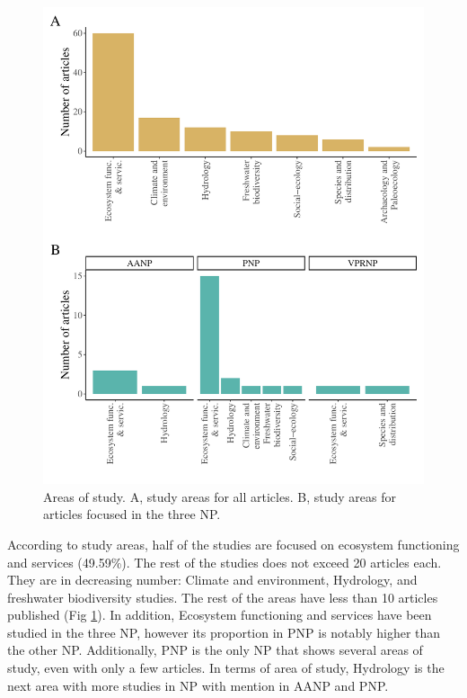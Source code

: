 \documentclass[]{article}
\begin{document}
\begin{figure}
\centering
\includegraphics{Review_and_climate_files/figure-latex/Areas-1.pdf}
\caption{\label{fig:Areas}Areas of study. A, study areas for all articles. B, study areas for articles focused in the three NP.}
\end{figure}

According to study areas, half of the studies are focused on ecosystem functioning and services (49.59\%). The rest of the studies does not exceed 20 articles each. They are in decreasing number: Climate and environment, Hydrology, and freshwater biodiversity studies. The rest of the areas have less than 10 articles published (Fig \ref{fig:Areas}).
In addition, Ecosystem functioning and services have been studied in the three NP, however its proportion in PNP is notably higher than the other NP. Additionally, PNP is the only NP that shows several areas of study, even with only a few articles. In terms of area of study, Hydrology is the next area with more studies in NP with mention in AANP and PNP.
\end{document}
